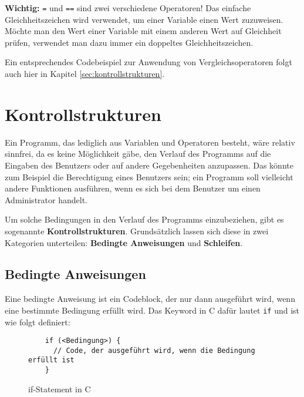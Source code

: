 \documentclass[11pt]{article}
\begin{document}
\textbf{Wichtig:} \texttt{=} und \texttt{==} sind zwei verschiedene Operatoren! Das einfache Gleichheitszeichen wird verwendet,
um einer Variable einen Wert zuzuweisen. Möchte man den Wert einer Variable mit einem anderen Wert auf Gleichheit prüfen,
verwendet man dazu immer ein doppeltes Gleichheitszeichen.

Ein entsprechendes Codebeispiel zur Anwendung von Vergleichsoperatoren folgt auch hier in Kapitel \ref{sec:kontrollstrukturen}.

\section{Kontrollstrukturen}{\label{sec:kontrollstrukturen}}
Ein Programm, das lediglich aus Variablen und Operatoren besteht, wäre relativ sinnfrei, da es keine Möglichkeit gäbe,
den Verlauf des Programms auf die Eingaben des Benutzers oder auf andere Gegebenheiten anzupassen. Das könnte zum Beispiel
die Berechtigung eines Benutzers sein; ein Programm soll vielleicht andere Funktionen ausführen, wenn es sich bei dem Benutzer
um einen Administrator handelt.

Um solche Bedingungen in den Verlauf des Programms einzubeziehen, gibt es sogenannte \textbf{Kontrollstrukturen}.
Grundsätzlich lassen sich diese in zwei Kategorien unterteilen: \textbf{Bedingte Anweisungen} und \textbf{Schleifen}.

\subsection{Bedingte Anweisungen}
Eine bedingte Anweisung ist ein Codeblock, der nur dann ausgeführt wird, wenn eine bestimmte Bedingung erfüllt wird. Das
Keyword in C dafür lautet \texttt{if} und ist wie folgt definiert:
\begin{figure}[h!]
  \begin{verbatim}
    if (<Bedingung>) {
      // Code, der ausgeführt wird, wenn die Bedingung erfüllt ist
    }
  \end{verbatim}
  \caption{if-Statement in C}
  \label{fig:if-statement}
\end{figure}
\end{document}
